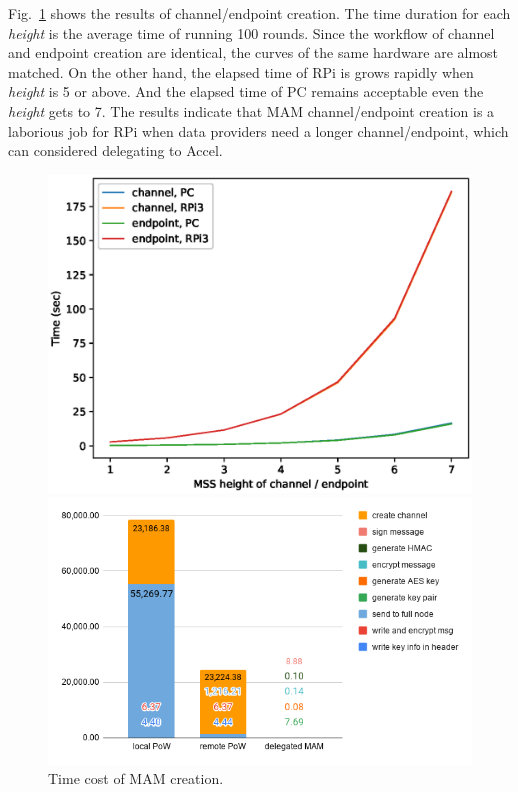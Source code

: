\documentclass[conference]{IEEEtran}
\begin{document}
Fig.~\ref{fig:mam_create} shows the results of channel/endpoint creation. The time duration for each \textit{height} is the average time of running 100 rounds. Since the workflow of channel and endpoint creation are identical, the curves of the same hardware are almost matched. On the other hand, the elapsed time of RPi is grows rapidly when \textit{height} is 5 or above. And the elapsed time of PC remains acceptable even the \textit{height} gets to 7. The results indicate that MAM channel/endpoint creation is a laborious job for RPi when data providers need a longer channel/endpoint, which can considered delegating to Accel.
\begin{figure}[!htb]
  \includegraphics[width=\linewidth]{mam_create}
  \caption{Time cost of MAM creation.}\label{fig:mam_create}
\endminipage\hfill
{}
  \includegraphics[width=\linewidth]{rpi3_pow}

\end{figure}
\end{document}
